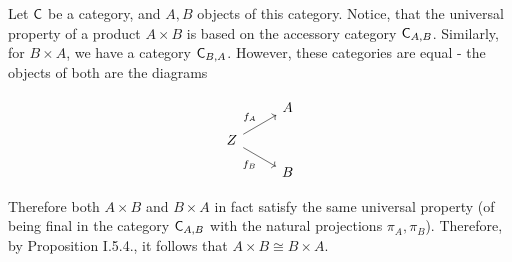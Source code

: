 \begin{problem}
\end{problem}

\begin{solution}
	Let $\mathsf{C}$ be a category, and $A, B$ objects of this category. Notice, that the universal property of a product $A \times B$ is based on the accessory category $\mathsf{C}_{A,B}$. Similarly, for $B \times A$, we have a category $\mathsf{C}_{B, A}$. However, these categories are equal - the objects of both are the diagrams
	
	\begin{equation*}
		\begin{tikzcd}[row sep=small]
			& A \\
			Z \arrow[ur, "f_A"]
			\arrow[dr, "f_B"'] \\
			& B
		\end{tikzcd}
	\end{equation*}
	
	Therefore both $A \times B$ and $B \times A$ in fact satisfy the same universal property (of being final in the category $\mathsf{C}_{A,B}$ with the natural projections $\pi_{A}, \pi_{B}$). Therefore, by Proposition I.5.4., it follows that $A \times B \cong B \times A$.
\end{solution}

\begin{problem}
\end{problem}

